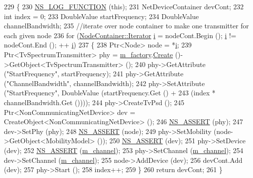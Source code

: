 \begin{DoxyCode}
229 \{
230   \hyperlink{log-macros-disabled_8h_a90b90d5bad1f39cb1b64923ea94c0761}{NS\_LOG\_FUNCTION} (\textcolor{keyword}{this});
231   NetDeviceContainer devCont;
232   \textcolor{keywordtype}{int} index = 0;
233   DoubleValue startFrequency;
234   DoubleValue channelBandwidth;
235   \textcolor{comment}{//iterate over node container to make one transmitter for each given node}
236   \textcolor{keywordflow}{for} (\hyperlink{classns3_1_1NodeContainer_aa1a9f2d2b09bfef7d066d3974bca2cc4}{NodeContainer::Iterator} \hyperlink{bernuolliDistribution_8m_a6f6ccfcf58b31cb6412107d9d5281426}{i} = nodeCont.Begin (); \hyperlink{bernuolliDistribution_8m_a6f6ccfcf58b31cb6412107d9d5281426}{i} != nodeCont.End (); ++
      \hyperlink{bernuolliDistribution_8m_a6f6ccfcf58b31cb6412107d9d5281426}{i})
237     \{
238       Ptr<Node> node = *\hyperlink{bernuolliDistribution_8m_a6f6ccfcf58b31cb6412107d9d5281426}{i};
239       Ptr<TvSpectrumTransmitter> phy = \hyperlink{classns3_1_1TvSpectrumTransmitterHelper_ae89194664bc52ed899f7dd0d074e588c}{m\_factory}.\hyperlink{classns3_1_1ObjectFactory_a18152e93f0a6fe184ed7300cb31e9896}{Create} ()->GetObject<TvSpectrumTransmitter>
       ();
240       phy->GetAttribute (\textcolor{stringliteral}{"StartFrequency"}, startFrequency);
241       phy->GetAttribute (\textcolor{stringliteral}{"ChannelBandwidth"}, channelBandwidth);
242       phy->SetAttribute (\textcolor{stringliteral}{"StartFrequency"}, DoubleValue (startFrequency.Get () + 
243                          (index * channelBandwidth.Get ())));
244       phy->CreateTvPsd ();
245       Ptr<NonCommunicatingNetDevice> dev = CreateObject<NonCommunicatingNetDevice> ();
246       \hyperlink{assert_8h_a6dccdb0de9b252f60088ce281c49d052}{NS\_ASSERT} (phy);
247       dev->SetPhy (phy);
248       \hyperlink{assert_8h_a6dccdb0de9b252f60088ce281c49d052}{NS\_ASSERT} (node);
249       phy->SetMobility (node->GetObject<MobilityModel> ());
250       \hyperlink{assert_8h_a6dccdb0de9b252f60088ce281c49d052}{NS\_ASSERT} (dev);
251       phy->SetDevice (dev);
252       \hyperlink{assert_8h_a6dccdb0de9b252f60088ce281c49d052}{NS\_ASSERT} (\hyperlink{classns3_1_1TvSpectrumTransmitterHelper_afc92164bf4a2a99985189207ee3a53a8}{m\_channel});
253       phy->SetChannel (\hyperlink{classns3_1_1TvSpectrumTransmitterHelper_afc92164bf4a2a99985189207ee3a53a8}{m\_channel});
254       dev->SetChannel (\hyperlink{classns3_1_1TvSpectrumTransmitterHelper_afc92164bf4a2a99985189207ee3a53a8}{m\_channel});
255       node->AddDevice (dev);
256       devCont.Add (dev);
257       phy->Start ();
258       index++;
259     \}
260   \textcolor{keywordflow}{return} devCont;
261 \}
\end{DoxyCode}


